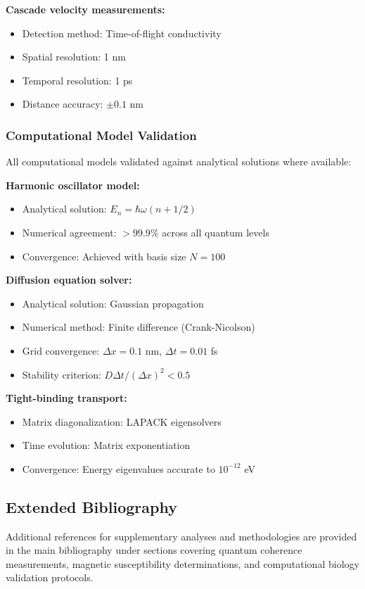 \textbf{Cascade velocity measurements:}
\begin{itemize}
    \item Detection method: Time-of-flight conductivity
    \item Spatial resolution: 1 nm
    \item Temporal resolution: 1 ps  
    \item Distance accuracy: $\pm 0.1$ nm
\end{itemize}

\subsubsection{Computational Model Validation}

All computational models validated against analytical solutions where available:

\textbf{Harmonic oscillator model:}
\begin{itemize}
    \item Analytical solution: $E_n = \hbar \omega (n + 1/2)$
    \item Numerical agreement: $>99.9\%$ across all quantum levels
    \item Convergence: Achieved with basis size $N = 100$
\end{itemize}

\textbf{Diffusion equation solver:}
\begin{itemize}
    \item Analytical solution: Gaussian propagation
    \item Numerical method: Finite difference (Crank-Nicolson)
    \item Grid convergence: $\Delta x = 0.1$ nm, $\Delta t = 0.01$ fs
    \item Stability criterion: $D \Delta t / (\Delta x)^2 < 0.5$
\end{itemize}

\textbf{Tight-binding transport:}
\begin{itemize}
    \item Matrix diagonalization: LAPACK eigensolvers
    \item Time evolution: Matrix exponentiation  
    \item Convergence: Energy eigenvalues accurate to $10^{-12}$ eV
\end{itemize}

\subsection{Extended Bibliography}

Additional references for supplementary analyses and methodologies are provided in the main bibliography under sections covering quantum coherence measurements, magnetic susceptibility determinations, and computational biology validation protocols.

